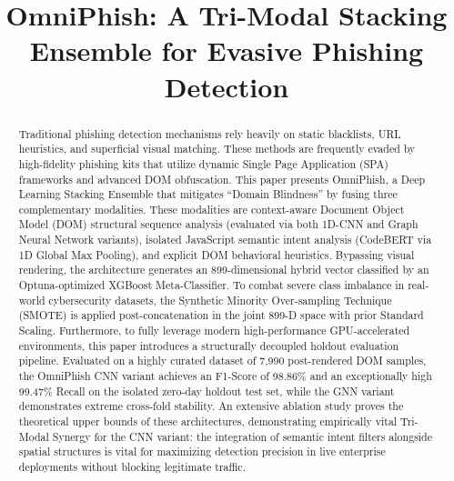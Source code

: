\documentclass[conference]{IEEEtran}
\begin{document}
\title{OmniPhish: A Tri-Modal Stacking Ensemble for Evasive Phishing Detection\\}

\author{
\and
{}
\and
{}
}

\maketitle

\begin{abstract}
Traditional phishing detection mechanisms rely heavily on static blacklists, URL heuristics, and superficial visual matching. These methods are frequently evaded by high-fidelity phishing kits that utilize dynamic Single Page Application (SPA) frameworks and advanced DOM obfuscation. This paper presents OmniPhish, a Deep Learning Stacking Ensemble that mitigates ``Domain Blindness'' by fusing three complementary modalities. These modalities are context-aware Document Object Model (DOM) structural sequence analysis (evaluated via both 1D-CNN and Graph Neural Network variants), isolated JavaScript semantic intent analysis (CodeBERT via 1D Global Max Pooling), and explicit DOM behavioral heuristics. Bypassing visual rendering, the architecture generates an 899-dimensional hybrid vector classified by an Optuna-optimized XGBoost Meta-Classifier. To combat severe class imbalance in real-world cybersecurity datasets, the Synthetic Minority Over-sampling Technique (SMOTE) is applied post-concatenation in the joint 899-D space with prior Standard Scaling. Furthermore, to fully leverage modern high-performance GPU-accelerated environments, this paper introduces a structurally decoupled holdout evaluation pipeline. Evaluated on a highly curated dataset of 7,990 post-rendered DOM samples, the OmniPhish CNN variant achieves an F1-Score of 98.86\% and an exceptionally high 99.47\% Recall on the isolated zero-day holdout test set, while the GNN variant demonstrates extreme cross-fold stability. An extensive ablation study proves the theoretical upper bounds of these architectures, demonstrating empirically vital Tri-Modal Synergy for the CNN variant: the integration of semantic intent filters alongside spatial structures is vital for maximizing detection precision in live enterprise deployments without blocking legitimate traffic.
\end{abstract}
\end{document}
